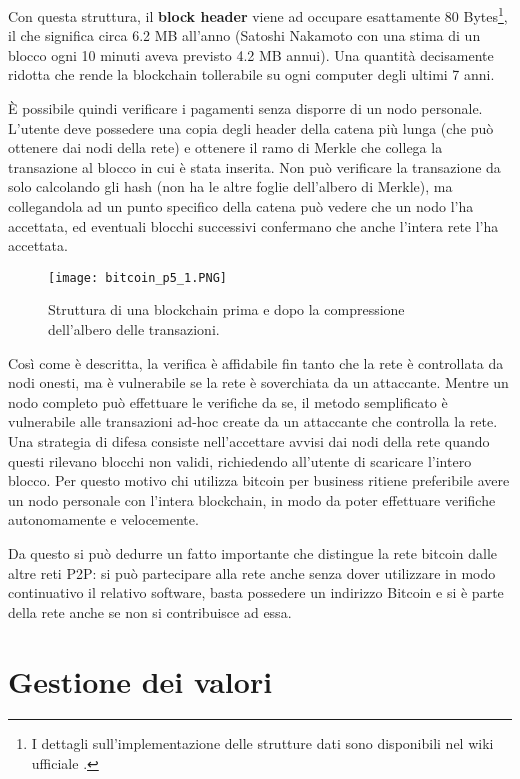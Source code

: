 Con questa struttura, il \textbf{block header} viene ad occupare esattamente 80 Bytes\footnote{I dettagli sull'implementazione delle strutture dati sono disponibili nel wiki ufficiale \cite{bitcoin-protocol}.}, il che significa circa 6.2 MB all'anno (Satoshi Nakamoto con una stima di un blocco ogni 10 minuti aveva previsto 4.2 MB annui). Una quantità decisamente ridotta che rende la blockchain tollerabile su ogni computer degli ultimi 7 anni.

È possibile quindi verificare i pagamenti senza disporre di un nodo personale. L'utente deve possedere una copia degli header della catena più lunga (che può ottenere dai nodi della rete) e ottenere il ramo di Merkle che collega la transazione al blocco in cui è stata inserita. Non può verificare la transazione da solo calcolando gli hash (non ha le altre foglie dell'albero di Merkle), ma collegandola ad un punto specifico della catena può vedere che un nodo l'ha accettata, ed eventuali blocchi successivi confermano che anche l'intera rete l'ha accettata.

\begin{figure}[htbp]
\centering
\texttt{[image: bitcoin\_p5\_1.PNG]}
\caption[Blockchain con blocchi compressi]{Struttura di una blockchain prima e dopo la compressione dell'albero delle transazioni.\label{bitcoin_p5_1}}
\end{figure}

Così come è descritta, la verifica è affidabile fin tanto che la rete è controllata da nodi onesti, ma è vulnerabile se la rete è soverchiata da un attaccante. Mentre un nodo completo può effettuare le verifiche da se, il metodo semplificato è vulnerabile alle transazioni ad-hoc create da un attaccante che controlla la rete. Una strategia di difesa consiste nell'accettare avvisi dai nodi della rete quando questi rilevano blocchi non validi, richiedendo all'utente di scaricare l'intero blocco. Per questo motivo chi utilizza bitcoin per business ritiene preferibile avere un nodo personale con l'intera blockchain, in modo da poter effettuare verifiche autonomamente e velocemente.

Da questo si può dedurre un fatto importante che distingue la rete bitcoin dalle altre reti P2P: si può partecipare alla rete anche senza dover utilizzare in modo continuativo il relativo software, basta possedere un indirizzo Bitcoin e si è parte della rete anche se non si contribuisce ad essa.

\section{Gestione dei valori}\label{gestione-dei-valori}

